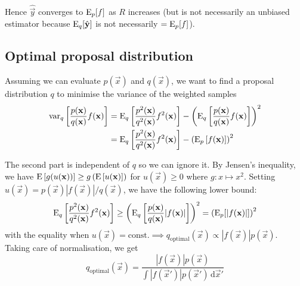     Hence $\hat{\vec y}$ converges to $\operatorname{\mathrm{E}}_p[f]$ as $R$ increases (but is not necessarily an unbiased estimator because $\operatorname{\mathrm{E}}_q[\hat{\boldsymbol{\mathbf{y}}}]$ is not necessarily $= \operatorname{\mathrm{E}}_p[f]$).

\subsection{Optimal proposal distribution}
    Assuming we can evaluate $p(\vec x)$ and $q(\vec x)$, we want to find a proposal distribution $q$ to minimise the variance of the weighted samples
    \begin{align}
        \operatorname{\mathrm{var}}_q\left[\frac{p(\boldsymbol{\mathbf{x}})}{q(\boldsymbol{\mathbf{x}})} f(\boldsymbol{\mathbf{x}})\right]    &= \operatorname{\mathrm{E}}_q\left[\frac{p^2(\boldsymbol{\mathbf{x}})}{q^2(\boldsymbol{\mathbf{x}})} f^2(\boldsymbol{\mathbf{x}})\right] - \left( \operatorname{\mathrm{E}}_q\left[\frac{p(\boldsymbol{\mathbf{x}})}{q(\boldsymbol{\mathbf{x}})} f(\boldsymbol{\mathbf{x}})\right] \right)^2 \\
                                                                    &= \operatorname{\mathrm{E}}_q\left[\frac{p^2(\boldsymbol{\mathbf{x}})}{q^2(\boldsymbol{\mathbf{x}})} f^2(\boldsymbol{\mathbf{x}})\right] - \left( \operatorname{\mathrm{E}}_p\left[f(\boldsymbol{\mathbf{x}})\right] \right)^2
    \end{align}

    The second part is independent of $q$ so we can ignore it. By Jensen's inequality, we have $\operatorname{\mathrm{E}}\left[g(u(\boldsymbol{\mathbf{x}}))\right] \geq g\left(\operatorname{\mathrm{E}}\left[u(\boldsymbol{\mathbf{x}}\right)]\right)$ for $u(\vec x) \geq 0$ where $g: x \mapsto x^2$. Setting $u(\vec x) = p(\vec x)|f(\vec x)| / q(\vec x)$, we have the following lower bound:
    \begin{equation}
        \operatorname{\mathrm{E}}_q\left[\frac{p^2(\boldsymbol{\mathbf{x}})}{q^2(\boldsymbol{\mathbf{x}})} f^2(\boldsymbol{\mathbf{x}})\right] \geq \left( \operatorname{\mathrm{E}}_q\left[\frac{p(\boldsymbol{\mathbf{x}})}{q(\boldsymbol{\mathbf{x}})} |f(\boldsymbol{\mathbf{x}})|\right] \right)^2 = \left( \operatorname{\mathrm{E}}_p[|f(\boldsymbol{\mathbf{x}})|] \right)^2
    \end{equation}
    with the equality when $u(\vec x) = \text{const.} \implies q_{\text{optimal}}(\vec x) \propto |f(\vec x)|p(\vec x)$. Taking care of normalisation, we get
    \begin{equation}
        q_{\text{optimal}}(\vec x) = \frac{|f(\vec x)|p(\vec x)}{\int |f(\vec x')|p(\vec x') \,\mathrm d \vec x'}
    \end{equation}